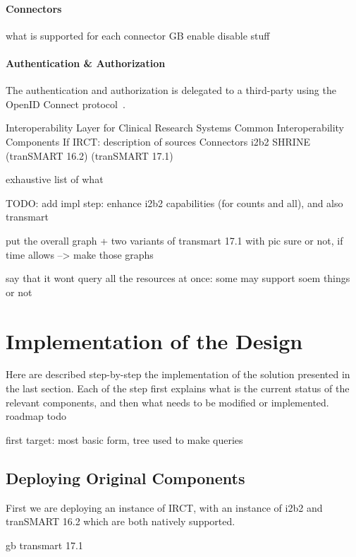 \paragraph{Connectors}
what is supported for each connector
GB enable disable stuff

\paragraph{Authentication \& Authorization}
The authentication and authorization is delegated to a third-party using the OpenID Connect protocol~\cite{openidconnect}.





Interoperability Layer for Clinical Research Systems
Common Interoperability Components
If IRCT: description of sources
Connectors
i2b2
SHRINE
(tranSMART 16.2)
(tranSMART 17.1)

exhaustive list of what

TODO: add impl step: enhance i2b2 capabilities (for counts and all), and also transmart



put the overall graph + two variants of transmart 17.1 with pic sure or not, if time allows
--> make those graphs

say that it wont query all the resources at once: some may support soem things or not 


\section{Implementation of the Design}
Here are described step-by-step the implementation of the solution presented in the last section. 
Each of the step first explains what is the current status of the relevant components, and then what needs to be modified or implemented.
roadmap todo


first target: most basic form, tree used to make queries


\subsection{Deploying Original Components}
First we are deploying an instance of IRCT, with an instance of i2b2 and tranSMART 16.2 which are both natively supported. 

gb
transmart 17.1


